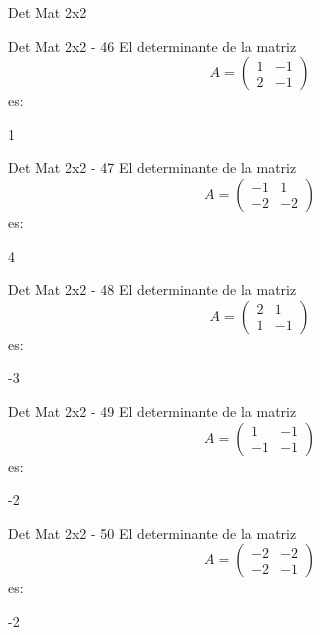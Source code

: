 \documentclass[a4,11pt]{aleph-notas}
\begin{document}
\begin{quiz}{Det Mat 2x2}
\begin{numerical}[tolerance=0]%
    {Det Mat 2x2 - 46}
    El determinante de la matriz
    \[
        A = \begin{pmatrix} 1 & -1 \\ 2 & -1 \end{pmatrix}
    \]
    es:
    \item[] 1
\end{numerical}

\begin{numerical}[tolerance=0]%
    {Det Mat 2x2 - 47}
    El determinante de la matriz
    \[
        A = \begin{pmatrix} -1 & 1 \\ -2 & -2 \end{pmatrix}
    \]
    es:
    \item[] 4
\end{numerical}

\begin{numerical}[tolerance=0]%
    {Det Mat 2x2 - 48}
    El determinante de la matriz
    \[
        A = \begin{pmatrix} 2 & 1 \\ 1 & -1 \end{pmatrix}
    \]
    es:
    \item[] -3
\end{numerical}

\begin{numerical}[tolerance=0]%
    {Det Mat 2x2 - 49}
    El determinante de la matriz
    \[
        A = \begin{pmatrix} 1 & -1 \\ -1 & -1 \end{pmatrix}
    \]
    es:
    \item[] -2
\end{numerical}

\begin{numerical}[tolerance=0]%
    {Det Mat 2x2 - 50}
    El determinante de la matriz
    \[
        A = \begin{pmatrix} -2 & -2 \\ -2 & -1 \end{pmatrix}
    \]
    es:
    \item[] -2
\end{numerical}


\end{quiz}
\end{document}
